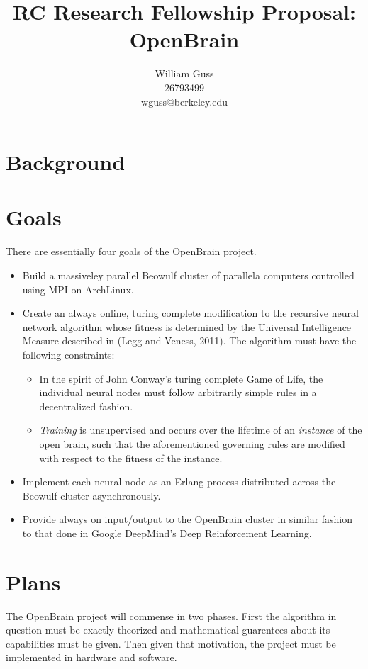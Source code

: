 \documentclass[letter]{article}
\title{RC Research Fellowship Proposal: OpenBrain}
\author{William Guss\\26793499\\wguss@berkeley.edu}
\begin{document}
\maketitle
\thispagestyle{empty}


\section{Background} 
\section{Goals}
There are essentially four goals of the OpenBrain project. 
\begin{itemize}
\item Build a massiveley parallel Beowulf cluster of parallela computers controlled using MPI on ArchLinux. 
\item Create an always online, turing complete modification to the recursive neural network algorithm whose fitness
is determined by the Universal Intelligence Measure described in (Legg and Veness, 2011). The algorithm must have the 
following constraints:
    \begin{itemize}
        \item In the spirit of John Conway's turing complete Game of Life, the individual neural nodes must follow
         arbitrarily simple rules in a decentralized fashion.
        \item \emph{Training} is unsupervised and occurs over the lifetime of an \emph{instance} of the open brain,
        such that the aforementioned governing rules are modified with respect to the fitness of the instance.
    \end{itemize}
\item Implement each neural node as an Erlang process distributed across the Beowulf cluster asynchronously.
\item Provide always on input/output to the OpenBrain cluster in similar fashion to that done in Google DeepMind's
  Deep Reinforcement Learning.
\end{itemize} 


\section{Plans}
The OpenBrain project will commense in two phases. First the algorithm in question must be exactly theorized and mathematical
guarentees about its capabilities must be given. Then given that motivation, the project must be implemented in hardware and software.
\end{document}
